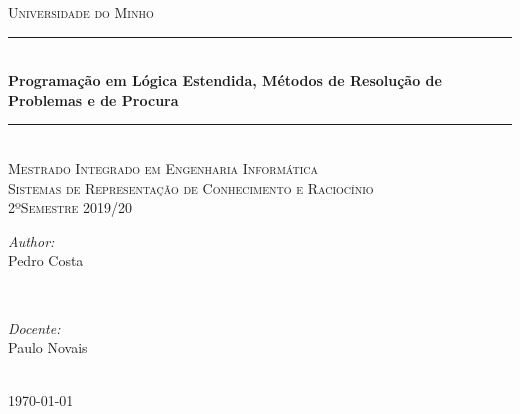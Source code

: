 \documentclass[20pt]{article}
\begin{document}
\begin{titlepage}

\newcommand{\HRule}{\rule{\linewidth}{0.5mm}} %

\center %


\textsc{\LARGE Universidade do Minho}\\[1.5cm]
\HRule \\[0.4cm]

{ \huge \bfseries Programação em Lógica Estendida, Métodos de Resolução de Problemas e de Procura}\\[0.4cm]
\HRule \\[1.5cm]
\textsc{\Large Mestrado Integrado em Engenharia Informática}\\[0.5cm]
\textsc{\large Sistemas de Representação de Conhecimento e Raciocínio}\\[0.5cm]
\textsc{\large 2ºSemestre 2019/20}\\[0.5cm]



\begin{minipage}{0.4\textwidth}
\begin{flushleft} \large
\emph{Author:}\\
Pedro Costa \\

\end{flushleft}
\end{minipage}
~
\begin{minipage}{0.4\textwidth}
\begin{flushright} \large
\emph{Docente:} \\
Paulo Novais\\
\end{flushright}
\end{minipage}\\[2cm]


{\large \today}\\[2cm]




\vfill %

\end{titlepage}
\end{document}

